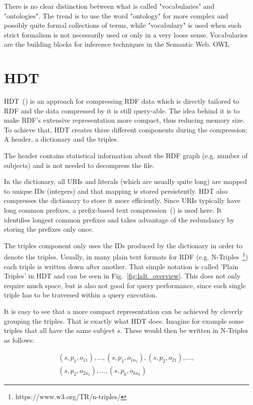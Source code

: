 There is no clear distinction between what is called "vocabularies" and "ontologies". The trend is to use the word "ontology" for more complex and possibly quite formal collections of terms, while "vocabulary" is used when such strict formalism is not necessarily used or only in a very loose sense. Vocabularies are the building blocks for inference techniques in the Semantic Web.
\ac{OWL} 

\section{HDT}\label{related_work_hdt}

HDT~(\cite{hdt}) is an approach for compressing RDF data which is directly tailored to RDF and the data compressed by it is still query-able. The idea behind it is to make RDF's extensive representation more compact, thus reducing memory size. To achieve that, HDT creates three different components during the compression: A header, a dictionary and the triples.

The header contains statistical information about the RDF graph (e.g. number of subjects) and is not needed to decompress the file.

In the dictionary, all URIs and literals (which are usually quite long) are mapped to unique IDs (integers) and that mapping is stored persistently. HDT also compresses the dictionary to store it more efficiently. Since URIs typically have long common prefixes, a prefix-based text compression~(\cite{ppm}) is used here. It identifies longest common prefixes and takes advantage of the redundancy by storing the prefixes only once.

The triples component only uses the IDs produced by the dictionary in order to denote the triples. Usually, in many plain text formats for RDF (e.g. N-Triples~\footnote{https://www.w3.org/TR/n-triples/}) each triple is written down after another. That simple notation is called 'Plain Triples' in HDT and can be seen in Fig.~\ref{fig:hdt_overview}. This does not only require much space, but is also not good for query performance, since each single triple has to be traversed within a query execution.

It is easy to see that a more compact representation can be achieved by cleverly grouping the triples. That is exactly what HDT does. Imagine for example some triples that all have the same subject $s$. These would then be written in N-Triples as follows:

\begin{align*}
(s,p_1,o_{11}),...,(s,p_1,o_{1n_1}),(s,p_2,o_{21}),...,\\
	(s,p_2,o_{2n_2}),...,(s,p_k,o_{kn_k})
\end{align*}

